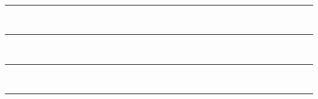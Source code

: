 \newpage
\thispagestyle{empty}
\begin{center}
  \renewcommand*{\familydefault}{\defaultFont}
  \fontsize{15pt}{15pt}\selectfont%
  \textbf{
  \reportAppName\\%
  }
\vspace{15pt} {%
  \begin{spacing}{0.05}
    \rule{200pt}{2pt}\\
    \rule{200pt}{0.75pt}\\
  \end{spacing}
  \renewcommand*{\familydefault}{\defaultFont}
  \fontsize{14pt}{14pt}\selectfont%
  \vspace{19pt}
  \textbf{\reportAuthors}
  \vspace{8pt}
  \begin{spacing}{0.05}
    \rule{200pt}{0.75pt}\\
    \rule{200pt}{2pt}\\
  \end{spacing}
}
\end{center}

